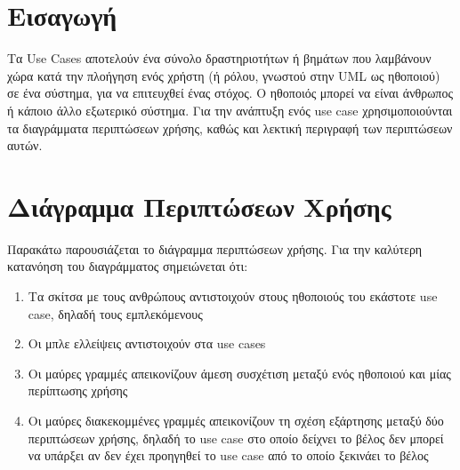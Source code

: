 \documentclass{article}
\begin{document}
{
  \hypersetup{linkcolor=black}
  \tableofcontents
}

\section{Εισαγωγή}

Τα Use Cases αποτελούν ένα σύνολο δραστηριοτήτων ή βημάτων που λαμβάνουν χώρα κατά την πλοήγηση ενός χρήστη (ή ρόλου, γνωστού στην UML ως ηθοποιού) σε ένα σύστημα, για να επιτευχθεί ένας στόχος. Ο ηθοποιός μπορεί να είναι άνθρωπος ή κάποιο άλλο εξωτερικό σύστημα. 
Για την ανάπτυξη ενός use case χρησιμοποιούνται τα διαγράμματα περιπτώσεων χρήσης, καθώς και λεκτική περιγραφή των περιπτώσεων αυτών.

\section{Διάγραμμα Περιπτώσεων Χρήσης}

Παρακάτω παρουσιάζεται το διάγραμμα περιπτώσεων χρήσης. Για την καλύτερη κατανόηση του διαγράμματος σημειώνεται ότι:

\begin{enumerate}
  \item Τα σκίτσα με τους ανθρώπους αντιστοιχούν στους ηθοποιούς του εκάστοτε use case, δηλαδή τους εμπλεκόμενους
  \item Οι μπλε ελλείψεις αντιστοιχούν στα use cases
  \item Οι μαύρες γραμμές απεικονίζουν άμεση συσχέτιση μεταξύ ενός ηθοποιού και μίας περίπτωσης χρήσης
  \item Οι μαύρες διακεκομμένες γραμμές απεικονίζουν τη σχέση εξάρτησης μεταξύ δύο περιπτώσεων χρήσης, δηλαδή το use case στο οποίο δείχνει το βέλος δεν μπορεί να υπάρξει αν δεν έχει προηγηθεί το use case από το οποίο ξεκινάει το βέλος  
\end{enumerate}


\newpage
\end{document}
